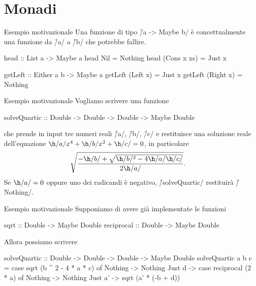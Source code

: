 \section*{Monadi}

\begin{frame}[fragile]{\secname}{Esempio motivazionale}
Una funzione di tipo \h/a -> Maybe b/ è concettualmente una funzione da \h/a/ a \h/b/ che potrebbe fallire.
\pause

\begin{haskellcode}
head :: List a -> Maybe a
head Nil = Nothing
head (Cons x xs) = Just x

getLeft :: Either a b -> Maybe a
getLeft (Left x) = Just x
getLeft (Right x) = Nothing
\end{haskellcode}
\end{frame}

\begin{frame}[fragile]{\secname}{Esempio motivazionale}
Vogliamo scrivere una funzione

\begin{haskellcode}
solveQuartic
    :: Double -> Double -> Double -> Maybe Double
\end{haskellcode}

che prende in input tre numeri reali \h/a/, \h/b/, \h/c/ e restituisce una soluzione reale dell'equazione $\h/a/x^4+\h/b/x^2+\h/c/=0$, in particolare
\[
\sqrt{\frac{-\h/b/+\sqrt{\h/b/^2-4\h/a/\h/c/}}{2\h/a/}}.
\]
\pause
Se $\h/a/=0$ oppure uno dei radicandi è negativo, \h/solveQuartic/ restituirà \h/Nothing/.
\end{frame}

\begin{frame}[fragile]{\secname}{Esempio motivazionale}
Supponiamo di avere già implementate le funzioni

\begin{haskellcode}
sqrt :: Double -> Maybe Double
reciprocal :: Double -> Maybe Double
\end{haskellcode}
\pause

Allora possiamo scrivere

\pause
\begin{haskellcode}
solveQuartic
    :: Double -> Double -> Double -> Maybe Double
solveQuartic a b c =
    case sqrt (b ^ 2 - 4 * a * c) of
        Nothing -> Nothing
        Just d -> case reciprocal (2 * a) of
            Nothing -> Nothing
            Just a' -> sqrt (a' * (-b + d))
\end{haskellcode}
\end{frame}


